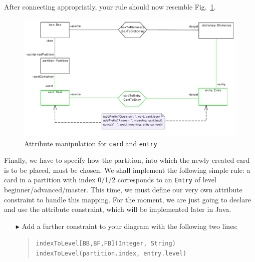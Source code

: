 After connecting appropriatly, your rule should now resemble Fig.~\ref{fig:cardtoentry_2}.

\begin{figure}[htbp]
\begin{center}
  \includegraphics[width=\textwidth]{pics/tggBilder/tggRule/tgg20}
  \caption{Attribute manipulation for \texttt{card} and \texttt{entry}}  
  \label{fig:cardtoentry_2}
\end{center}
\end{figure}

Finally, we have to specify how the partition, into which the newly created card is to be placed, must be chosen.
We shall implement the following simple rule: a card in a partition with index 0/1/2 corresponds to an \texttt{Entry} of level beginner/advanced/master.
This time, we must define our very own attribute constraint to handle this mapping.
For the moment, we are just going to declare and use the attribute constraint, which will be implemented later in Java.

\begin{enumerate}
\item[$\blacktriangleright$] Add a further constraint to your diagram with the following two lines:
\begin{quotation}
\noindent \texttt{indexToLevel[BB,BF,FB](Integer, String)}\\ 
\texttt{indexToLevel(partition.index, entry.level)} 
\end{quotation}
\end{enumerate}

